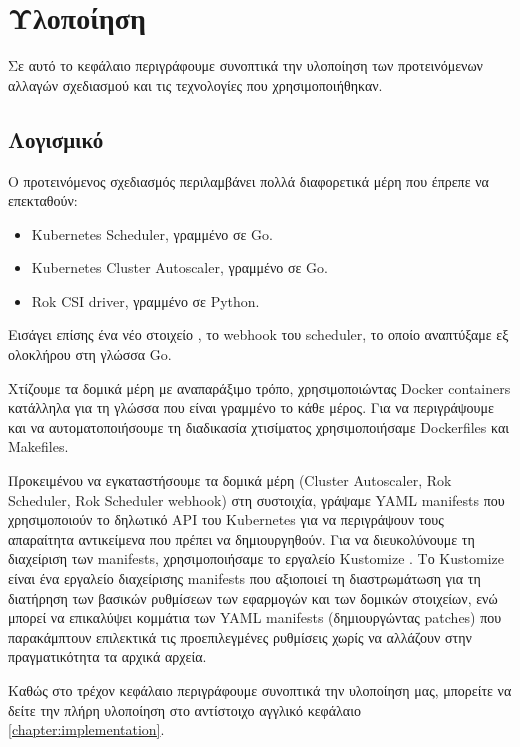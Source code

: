 \chapter{Υλοποίηση} \label{chapter:gr-implementation}

Σε αυτό το κεφάλαιο περιγράφουμε συνοπτικά την υλοποίηση των προτεινόμενων
αλλαγών σχεδιασμού και τις τεχνολογίες που χρησιμοποιήθηκαν.

\section{Λογισμικό}

Ο προτεινόμενος σχεδιασμός περιλαμβάνει πολλά διαφορετικά μέρη που έπρεπε να επεκταθούν:
\begin{itemize}
    \tightlist
    \item Kubernetes Scheduler, γραμμένο σε Go.
    \item Kubernetes Cluster Autoscaler, γραμμένο σε Go.
    \item Rok CSI driver, γραμμένο σε Python.
\end{itemize}


Εισάγει επίσης ένα νέο στοιχείο , το webhook του scheduler, το οποίο
αναπτύξαμε εξ ολοκλήρου στη γλώσσα Go.

Χτίζουμε τα δομικά μέρη με αναπαράξιμο τρόπο, χρησιμοποιώντας  Docker
containers κατάλληλα για τη γλώσσα που είναι γραμμένο το κάθε μέρος. Για
να περιγράψουμε και να αυτοματοποιήσουμε τη διαδικασία χτισίματος
χρησιμοποιήσαμε Dockerfiles και Makefiles.

Προκειμένου να εγκαταστήσουμε τα δομικά μέρη (Cluster Autoscaler, Rok Scheduler,
Rok Scheduler webhook) στη συστοιχία, γράψαμε YAML manifests που χρησιμοποιούν
το δηλωτικό API του Kubernetes για να περιγράψουν τους απαραίτητα αντικείμενα
που πρέπει να δημιουργηθούν. Για να διευκολύνουμε τη διαχείριση των manifests,
χρησιμοποιήσαμε το εργαλείο Kustomize . Το Kustomize είναι ένα εργαλείο
διαχείρισης manifests που αξιοποιεί τη διαστρωμάτωση για τη διατήρηση των
βασικών ρυθμίσεων των εφαρμογών και των δομικών στοιχείων,  ενώ μπορεί να
επικαλύψει κομμάτια των  YAML manifests (δημιουργώντας patches) που παρακάμπτουν
επιλεκτικά τις προεπιλεγμένες ρυθμίσεις χωρίς να αλλάζουν στην πραγματικότητα τα
αρχικά αρχεία.

Καθώς στο τρέχον κεφάλαιο περιγράφουμε συνοπτικά την υλοποίηση μας, μπορείτε να
δείτε την πλήρη υλοποίηση στο αντίστοιχο αγγλικό κεφάλαιο \ref{chapter:implementation}.